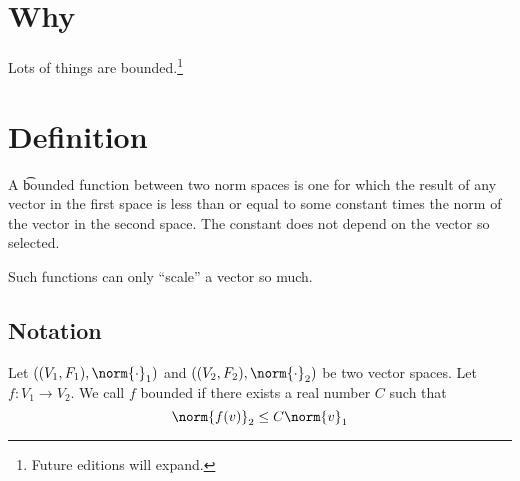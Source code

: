 

\section*{Why}

Lots of things are bounded.\footnote{Future editions will expand.}

\section*{Definition}

A \t{bounded function} between two norm spaces is one for which the result of any vector in the first space is less than or equal to some constant times the norm of the vector in the second space.
The constant does not depend on the vector so selected.

Such functions can only ``scale'' a vector so much.

\subsection*{Notation}

Let $((V_1, F_1), \norm{\cdot}_1)$ and $((V_2, F_2), \norm{\cdot}_2)$ be two vector spaces.
Let $f: V_1 \to V_2$.
We call $f$ bounded if there exists a real number $C$ such that
\[
\norm{f(v)}_2 \leq C \norm{v}_1
\]

\blankpage